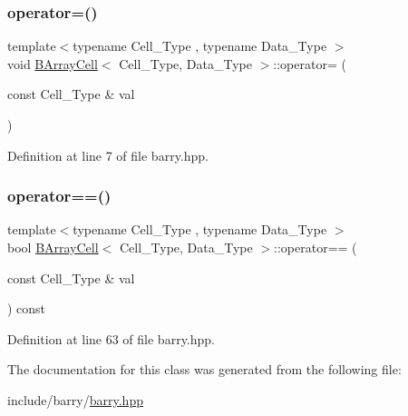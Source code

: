 \subsubsection{\texorpdfstring{operator=()}{operator=()}}
{\footnotesize\ttfamily template$<$typename Cell\+\_\+\+Type , typename Data\+\_\+\+Type $>$ \\
void \hyperlink{classbarry_1_1_b_array_cell}{B\+Array\+Cell}$<$ Cell\+\_\+\+Type, Data\+\_\+\+Type $>$\+::operator= (\begin{DoxyParamCaption}\item[{const Cell\+\_\+\+Type \&}]{val }\end{DoxyParamCaption})\hspace{0.3cm}{\ttfamily [inline]}}



Definition at line 7 of file barry.\+hpp.

\mbox{\label{classbarry_1_1_b_array_cell_a8d28c5b68b442ddf94cb99d8bc2f9cb9}} 
\subsubsection{\texorpdfstring{operator==()}{operator==()}}
{\footnotesize\ttfamily template$<$typename Cell\+\_\+\+Type , typename Data\+\_\+\+Type $>$ \\
bool \hyperlink{classbarry_1_1_b_array_cell}{B\+Array\+Cell}$<$ Cell\+\_\+\+Type, Data\+\_\+\+Type $>$\+::operator== (\begin{DoxyParamCaption}\item[{const Cell\+\_\+\+Type \&}]{val }\end{DoxyParamCaption}) const\hspace{0.3cm}{\ttfamily [inline]}}



Definition at line 63 of file barry.\+hpp.



The documentation for this class was generated from the following file\+:\begin{DoxyCompactItemize}
\item 
include/barry/\hyperlink{barry_8hpp}{barry.\+hpp}\end{DoxyCompactItemize}
